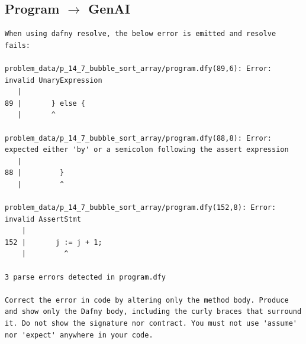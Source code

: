 \documentclass{article}
\begin{document}
\subsection*{Program $\rightarrow$ GenAI}
\begin{lstlisting}
When using dafny resolve, the below error is emitted and resolve fails:

problem_data/p_14_7_bubble_sort_array/program.dfy(89,6): Error: invalid UnaryExpression
   |
89 |       } else {
   |       ^

problem_data/p_14_7_bubble_sort_array/program.dfy(88,8): Error: expected either 'by' or a semicolon following the assert expression
   |
88 |         }
   |         ^

problem_data/p_14_7_bubble_sort_array/program.dfy(152,8): Error: invalid AssertStmt
    |
152 |       j := j + 1;
    |         ^

3 parse errors detected in program.dfy

Correct the error in code by altering only the method body. Produce and show only the Dafny body, including the curly braces that surround it. Do not show the signature nor contract. You must not use 'assume' nor 'expect' anywhere in your code.
\end{lstlisting}
\end{document}
